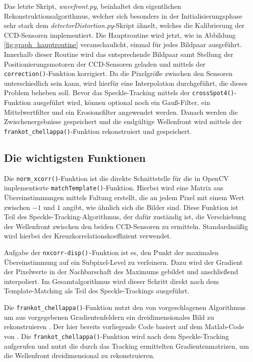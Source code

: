 Das letzte Skript, \textit{wavefront.py}, beinhaltet den eigentlichen Rekonstruktionsalgorithmus, welcher sich besonders in der Initialisierungsphase sehr stark dem \textit{detectorDistortion.py}-Skript ähnelt, welches die Kalibrierung der \gls{CCD}-Sensoren implementiert. Die Hauptroutine wird jetzt, wie in Abbildung \ref{fig:graph_hauptroutine} veranschaulicht, einmal für jedes Bildpaar ausgeführt. Innerhalb dieser Routine wird das entsprechende Bildpaar samt Stellung der Positionierungsmotoren der \gls{CCD}-Sensoren geladen und mittels der \texttt{correction()}-Funktion korrigiert. Da die Pixelgröße zwischen den Sensoren unterschiedlich sein kann, wird hierfür eine Interpolation durchgeführt, die dieses Problem beheben soll. Bevor das Speckle-Tracking mittels der \texttt{crossSpot4()}-Funktion ausgeführt wird, können optional noch ein Gauß-Filter, ein Mittelwertfilter und ein Erosionsfilter angewendet werden. Danach werden die Zwischenergebnisse gespeichert und die endgültige Wellenfront wird mittels der \texttt{frankot\_chellappa()}-Funktion rekonstruiert und gespeichert. 

\subsection{Die wichtigsten Funktionen}

\begin{sloppypar}
	Die \texttt{norm\_xcorr()}-Funktion ist die direkte Schnittstelle für die in OpenCV implementierte \texttt{matchTemplate()}-Funktion. Hierbei wird eine Matrix aus Übereinstimmungen mittels Faltung erstellt, die an jedem Pixel mit einem Wert zwischen $-1$ und $1$ angibt, wie ähnlich sich die Bilder sind. Diese Funktion ist Teil des Speckle-Tracking-Algorithmus, der dafür zuständig ist, die Verschiebung der Wellenfront zwischen den beiden \gls{CCD}-Sensoren zu ermitteln. Standardmäßig wird hierbei der Kreuzkorrelationskoeffizient verwendet. 
\end{sloppypar}

Aufgabe der \texttt{nxcorr-disp()-}Funktion ist es, den Punkt der maximalen Übereinstimmung auf ein Subpixel-Level zu verfeinern. Dazu wird der Gradient der Pixelwerte in der Nachbarschaft des Maximums gebildet und anschließend interpoliert. Im Gesamtalgorithmus wird dieser Schritt direkt nach dem Template-Matching als Teil des Speckle-Trackings ausgeführt.

\begin{sloppypar}
	Die \texttt{frankot\_chellappa()}-Funktion nutzt den von \citeauthor{FC88} vorgeschlagenen Algorithmus um aus vorgegebenen Gradientenfeldern ein dreidimensionales Bild zu rekonstruieren \cite{FC88}. Der hier bereits vorliegende Code basiert auf dem Matlab-Code von \citeauthor{Kov04} \cite{Kov04}. Die \texttt{frankot\_chellappa()}-Funktion wird nach dem Speckle-Tracking aufgerufen und nutzt die durch das Tracking ermittelten Gradientenmatrizen, um die Wellenfront dreidimensional zu rekonstruieren. 
\end{sloppypar}